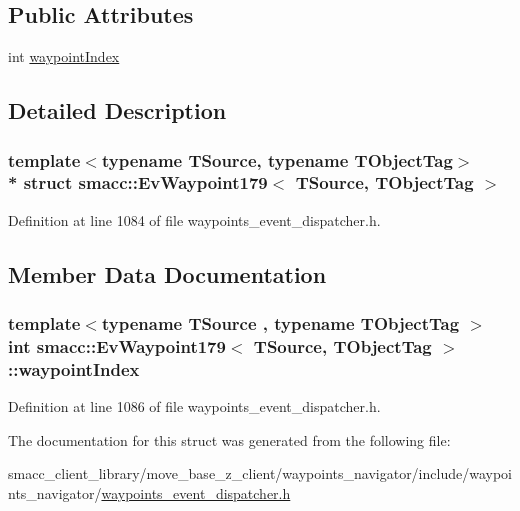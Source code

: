 \subsection*{Public Attributes}
\begin{DoxyCompactItemize}
\item 
int \hyperlink{structsmacc_1_1EvWaypoint179_ab53a822b783da7eb2c14f2aab05aefe2}{waypoint\+Index}
\end{DoxyCompactItemize}


\subsection{Detailed Description}
\subsubsection*{template$<$typename T\+Source, typename T\+Object\+Tag$>$\\*
struct smacc\+::\+Ev\+Waypoint179$<$ T\+Source, T\+Object\+Tag $>$}



Definition at line 1084 of file waypoints\+\_\+event\+\_\+dispatcher.\+h.



\subsection{Member Data Documentation}
\subsubsection[{\texorpdfstring{waypoint\+Index}{waypointIndex}}]{\setlength{\rightskip}{0pt plus 5cm}template$<$typename T\+Source , typename T\+Object\+Tag $>$ int {\bf smacc\+::\+Ev\+Waypoint179}$<$ T\+Source, T\+Object\+Tag $>$\+::waypoint\+Index}\hypertarget{structsmacc_1_1EvWaypoint179_ab53a822b783da7eb2c14f2aab05aefe2}{}\label{structsmacc_1_1EvWaypoint179_ab53a822b783da7eb2c14f2aab05aefe2}


Definition at line 1086 of file waypoints\+\_\+event\+\_\+dispatcher.\+h.



The documentation for this struct was generated from the following file\+:\begin{DoxyCompactItemize}
\item 
smacc\+\_\+client\+\_\+library/move\+\_\+base\+\_\+z\+\_\+client/waypoints\+\_\+navigator/include/waypoints\+\_\+navigator/\hyperlink{waypoints__event__dispatcher_8h}{waypoints\+\_\+event\+\_\+dispatcher.\+h}\end{DoxyCompactItemize}
